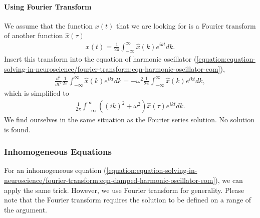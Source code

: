 \documentclass[letterpaper,10pt,english]{sphinxmanual}
\begin{document}
\paragraph{Using Fourier Transform}
\label{\detokenize{equation-solving-in-neuroscience/fourier-transform:using-fourier-transform}}
We assume that the function \(x(t)\) that we are looking for is a Fourier transform of another function \(\hat x(\tau)\)
\begin{equation*}
\begin{split}x(t) = \frac{1}{2\pi} \int_{-\infty}^\infty \hat x(k) e^{i k t} dk.\end{split}
\end{equation*}
Insert this transform into the equation of harmonic oscillator (\eqref{equation:equation-solving-in-neuroscience/fourier-transform:eqn-harmonic-oscillator-eom}),
\begin{equation*}
\begin{split}\frac{d^2}{dt^2} \frac{1}{2\pi} \int_{-\infty}^\infty \hat x(k) e^{i k t} dk = - \omega^2 \frac{1}{2\pi} \int_{-\infty}^\infty \hat x(k) e^{i k t} dk,\end{split}
\end{equation*}
which is simplified to
\begin{equation*}
\begin{split}\frac{1}{2\pi} \int_{-\infty}^\infty \left(  (i k  )^2  + \omega^2 \right) \hat x(\tau) e^{ik t} dk .\end{split}
\end{equation*}
We find ourselves in the same situation as the Fourier series solution. No solution is found.


\subsubsection{Inhomogeneous Equations}
\label{\detokenize{equation-solving-in-neuroscience/fourier-transform:inhomogeneous-equations}}
For an inhomogeneous equation (\eqref{equation:equation-solving-in-neuroscience/fourier-transform:eqn-damped-harmonic-oscillator-eom}), we can apply the same trick. However, we use Fourier transform for generality. Please note that the Fourier transform requires the solution to be defined on a range of the argument.
\end{document}
